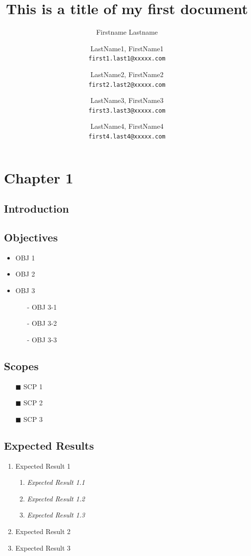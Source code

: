 \documentclass[a4paper]{report} %
\title{This is a title of my first document}
\author{Firstname Lastname}
\author{
		LastName1, FirstName1\\
		\texttt{first1.last1@xxxxx.com} 
		\and
		LastName2, FirstName2\\
		\texttt{first2.last2@xxxxx.com}
		\and
		LastName3, FirstName3\\
		\texttt{first3.last3@xxxxx.com}
		\and
		LastName4, FirstName4\\
		\texttt{first4.last4@xxxxx.com}
	}
\begin{document}
	\maketitle
	\setcounter{chapter}{1}
	\chapter*{Chapter 1}
	
	\section{Introduction}
	
	\section{Objectives}
	\begin{itemize}
		\item OBJ 1
		\item OBJ 2
		\item OBJ 3
		\begin{itemize}
			\item [-] OBJ 3-1
			\item [-] OBJ 3-2
			\item [-] OBJ 3-3
		\end{itemize}
	
	\end{itemize}

	\section{Scopes}
	\begin{itemize}
		\item [$\blacksquare$] SCP 1
		\item [$\blacksquare$] SCP 2
		\item [$\blacksquare$] SCP 3
	\end{itemize}
	
	\section{Expected Results}
	\begin{enumerate} [label=\arabic*)]
		\item Expected Result 1
		\begin{enumerate} [label=\textit{\roman*)}]
			\item \textit{Expected Result 1.1}
			\item \textit{Expected Result 1.2}
			\item \textit{Expected Result 1.3}
		\end{enumerate}
		\item Expected Result 2
		\item Expected Result 3
	\end{enumerate}
	\newpage
\end{document}
